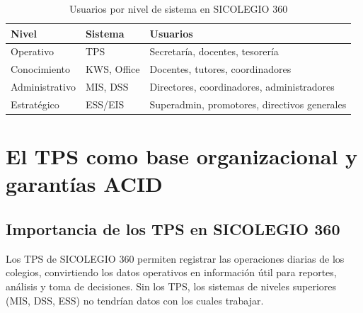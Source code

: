 \documentclass[12pt,a4paper,oneside]{report}
\begin{document}
\begin{table}[H]
\centering
\caption{Usuarios por nivel de sistema en SICOLEGIO 360}
\label{tab:usuarios}
\begin{tabularx}{\textwidth}{llX}
\toprule
Nivel & Sistema & Usuarios \\
\midrule
Operativo & TPS & Secretaría, docentes, tesorería \\
Conocimiento & KWS, Office & Docentes, tutores, coordinadores \\
Administrativo & MIS, DSS & Directores, coordinadores, administradores \\
Estratégico & ESS/EIS & Superadmin, promotores, directivos generales \\
\bottomrule
\end{tabularx}
\end{table}

\section{El TPS como base organizacional y garantías ACID}

\subsection{Importancia de los TPS en SICOLEGIO 360}
Los TPS de SICOLEGIO 360 permiten registrar las operaciones diarias de los colegios, convirtiendo los datos operativos en información útil para reportes, análisis y toma de decisiones. Sin los TPS, los sistemas de niveles superiores (MIS, DSS, ESS) no tendrían datos con los cuales trabajar.
\end{document}
